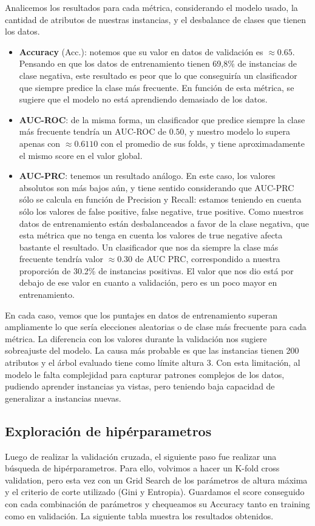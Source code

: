Analicemos los resultados para cada métrica, considerando el modelo usado, la cantidad de atributos de nuestras instancias, y el desbalance de clases que tienen los datos.
\begin{itemize}
    \item \textbf{Accuracy} (Acc.): notemos que su valor en datos de validación es $\approx 0.65$. Pensando en que los datos de entrenamiento tienen 69,8\% de instancias de clase negativa, este resultado es peor que lo que conseguiría un clasificador que siempre predice la clase más frecuente. En función de esta métrica, se sugiere que el modelo no está aprendiendo demasiado de los datos. 
    \item \textbf{AUC-ROC}: de la misma forma, un clasificador que predice siempre la clase más frecuente tendría un AUC-ROC de $0.50$, y nuestro modelo lo supera apenas con $\approx 0.6110$ con el promedio de sus folds, y tiene aproximadamente el mismo score en el valor global.
    \item \textbf{AUC-PRC}: tenemos un resultado análogo. En este caso, los valores absolutos son más bajos aún, y tiene sentido considerando que AUC-PRC sólo se calcula en función de Precision y Recall: estamos teniendo en cuenta sólo los valores de false positive, false negative, true positive. Como nuestros datos de entrenamiento están desbalanceados a favor de la clase negativa, que esta métrica que no tenga en cuenta los valores de true negative afecta bastante el resultado. Un clasificador que nos da siempre la clase más frecuente tendría valor  $\approx 0.30$ de AUC PRC, correspondido a nuestra proporción de 30.2\% de instancias positivas. El valor que nos dio está por debajo de ese valor en cuanto a validación, pero es un poco mayor en entrenamiento. 
     
\end{itemize}

En cada caso, vemos que los puntajes en datos de entrenamiento superan ampliamente lo que sería elecciones aleatorias o de clase más frecuente para cada métrica. La diferencia con los valores durante la validación nos sugiere sobreajuste del modelo. La causa más probable es que las instancias tienen 200 atributos y el árbol evaluado tiene como límite altura 3. Con esta limitación, al modelo le falta complejidad para capturar patrones complejos de los datos, pudiendo aprender instancias ya vistas, pero teniendo baja capacidad de generalizar a instancias nuevas.

\subsection*{Exploración de hipérparametros}	
Luego de realizar la validación cruzada, el siguiente paso fue realizar una búsqueda de hipérparametros. Para ello, volvimos a hacer un K-fold cross validation, pero esta vez con un Grid Search de los parámetros de altura máxima y el criterio de corte utilizado (Gini y Entropia). Guardamos el score conseguido con cada combinación de parámetros y chequeamos su Accuracy tanto en training como en validación. La siguiente tabla muestra los resultados obtenidos.

